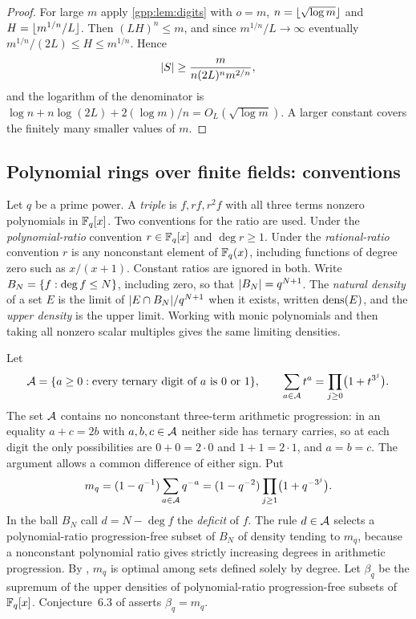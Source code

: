 \begin{proof}
For large $m$ apply \cref{gpp:lem:digits} with $o=m$, $n=\lfloor\sqrt{\log m}\rfloor$ and
$H=\lfloor m^{1/n}/L\rfloor$. Then $(LH)^n\le m$, and since $m^{1/n}/L\to\infty$ eventually
$m^{1/n}/(2L)\le H\le m^{1/n}$. Hence
\[
 \lvert S\rvert\ge\frac{m}{n(2L)^n m^{2/n}},
\]
and the logarithm of the denominator is $\log n+n\log(2L)+2(\log m)/n=O_L(\sqrt{\log m})$.
A larger constant covers the finitely many smaller values of $m$.
\end{proof}

\subsection{Polynomial rings over finite fields: conventions}\label{gpp:sec:conventions}
{\raggedright{}}

Let $q$ be a prime power. A \emph{triple} is $f,rf,r^2f$ with all three terms nonzero
polynomials in $\mathbb{F}_q[x]$. Two conventions for the ratio are used. Under the
\emph{polynomial-ratio} convention $r\in\mathbb{F}_q[x]$ and $\deg r\ge1$. Under the
\emph{rational-ratio} convention $r$ is any nonconstant element of $\mathbb{F}_q(x)$, including
functions of degree zero such as $x/(x+1)$. Constant ratios are ignored in both. Write
$B_N=\{f:\deg f\le N\}$, including zero, so that $\lvert B_N\rvert=q^{N+1}$. The \emph{natural
density} of a set $E$ is the limit of $\lvert E\cap B_N\rvert/q^{N+1}$ when it exists, written
$\operatorname{dens}(E)$, and the \emph{upper density} is the upper limit. Working with monic
polynomials and then taking all nonzero scalar multiples gives the same limiting
densities.

Let
\[
 \mathcal{A}=\{a\ge0:\text{every ternary digit of }a\text{ is }0\text{ or }1\},\qquad
 \sum_{a\in\mathcal{A}}t^a=\prod_{j\ge0}\bigl(1+t^{3^j}\bigr).
\]
The set $\mathcal{A}$ contains no nonconstant three-term arithmetic progression: in an equality
$a+c=2b$ with $a,b,c\in\mathcal{A}$ neither side has ternary carries, so at each digit the only
possibilities are $0+0=2\cdot0$ and $1+1=2\cdot1$, and $a=b=c$. The argument allows a
common difference of either sign. Put
\begin{equation}\label{gpp:eq:mq}
 m_q=(1-q^{-1})\sum_{a\in\mathcal{A}}q^{-a}=(1-q^{-2})\prod_{j\ge1}\bigl(1+q^{-3^j}\bigr).
\end{equation}
In the ball $B_N$ call $d=N-\deg f$ the \emph{deficit} of $f$. The rule $d\in\mathcal{A}$
selects a polynomial-ratio progression-free subset of $B_N$ of density tending to $m_q$,
because a nonconstant polynomial ratio gives strictly increasing degrees in arithmetic
progression. By \cite[Theorem~4.3]{Asada2017Subsets}, $m_q$ is optimal among sets defined
solely by degree. Let $\beta_q$ be the supremum of the upper densities of
polynomial-ratio progression-free subsets of $\mathbb{F}_q[x]$. Conjecture~6.3 of
\cite{Asada2017Subsets} asserts $\beta_q=m_q$.

